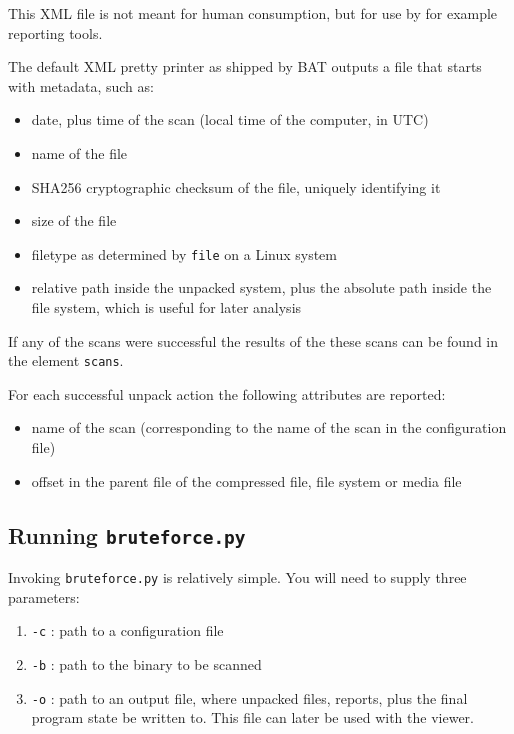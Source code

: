 \documentclass[10pt]{article}
\begin{document}
This XML file is not meant for human consumption, but for use by for example
reporting tools.

The default XML pretty printer as shipped by BAT outputs a file that starts
with metadata, such as:

\begin{itemize}
\item date, plus time of the scan (local time of the computer, in UTC)
\item name of the file
\item SHA256 cryptographic checksum of the file, uniquely identifying it
\item size of the file
\item filetype as determined by \texttt{file} on a Linux system
\item relative path inside the unpacked system, plus the absolute path inside
the file system, which is useful for later analysis
\end{itemize}

If any of the scans were successful the results of the these scans can
be found in the element \texttt{scans}.

For each successful unpack action the following attributes are reported:

\begin{itemize}
\item name of the scan (corresponding to the name of the scan in the
configuration file)
\item offset in the parent file of the compressed file, file system or media
file
\end{itemize}

\subsection{Running \texttt{bruteforce.py}}

Invoking \texttt{bruteforce.py} is relatively simple. You will need to supply
three parameters:

\begin{enumerate}
\item \texttt{-c} : path to a configuration file
\item \texttt{-b} : path to the binary to be scanned
\item \texttt{-o} : path to an output file, where unpacked files, reports,
plus the final program state be written to. This file can later be used with
the viewer.
\end{enumerate}
\end{document}
